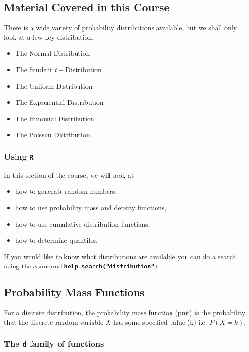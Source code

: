 \documentclass[a4paper,12pt]{article}
\begin{document}
\subsection{Material Covered in this Course} 
There is a wide variety of probability distributions available, but we shall only look at a few key distribution. 

\begin{itemize}
\item	The Normal Distribution
\item	The Student $t-$Distribution
\item   The Uniform Distribution
\item	The Exponential Distribution
\item	The Binomial Distribution
\item	The Poisson Distribution
\end{itemize}

\subsubsection{Using \texttt{R}}
In this section of the course, we will look at  
\begin{itemize}
\item how to generate random numbers,
\item how to use probability mass and density functions,
\item how to use cumulative distribution functions,
\item how to determine quantiles.
\end{itemize} 
If you would like to know what distributions are available you can do a search using the command \texttt{\textbf{help.search("distribution")}}. 



\subsection{Probability Mass Functions} 

For a discrete distribution, the probability mass function (pmf) is the probability that the discrete random variable $X$ has some specified value (k) i.e. $P(X = k)$. 

\subsubsection{The \texttt{d} family of functions}
\end{document}
